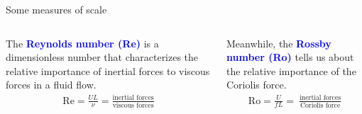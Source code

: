 \documentclass[aspectratio=169,xcolor=dvipsnames]{beamer}
\newcommand\boldblue[1]{\textcolor{blue}{\textbf{#1}}}
\begin{document}
\begin{frame}[t]{Some measures of scale}

\vspace{3em}

\begin{columns}
    \begin{column}[t]{0.5\textwidth}
        {\small
        The \boldblue{Reynolds number (Re)} is a dimensionless number that characterizes the relative importance of inertial forces to viscous forces in a fluid flow.
        \vspace{-0.5em}
        \begin{align*}
            \text{Re} = \frac{U L}{\nu} = \frac{\text{inertial forces}}{\text{viscous forces}}
        \end{align*}

        }
    \end{column}
    \begin{column}[t]{0.5\textwidth}
        {\small
        Meanwhile, the \boldblue{Rossby number (Ro)} tells us about the relative importance of the Coriolis force.
        \vspace{-0.2em}
        \begin{align*}
        \text{Ro} = \frac{U}{fL} = \ 
        \frac{\text{inertial forces}}
        {\text{Coriolis force}}
        \end{align*}

        }
    \end{column}
\end{columns}
\end{frame}
\end{document}
